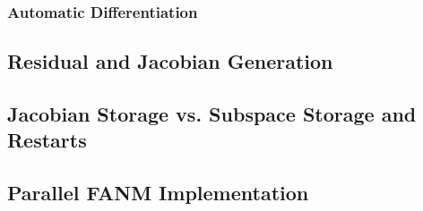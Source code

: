 \subsubsection{Automatic Differentiation}
\label{subsubsec:automatic_differentiation}

\subsection{Residual and Jacobian Generation}
\label{subsec:fanm_generation}

\subsection{Jacobian Storage vs. Subspace Storage and Restarts}
\label{subsec:fanm_storage}

\subsection{Parallel FANM Implementation}
\label{subsec:parallel_fanm}
